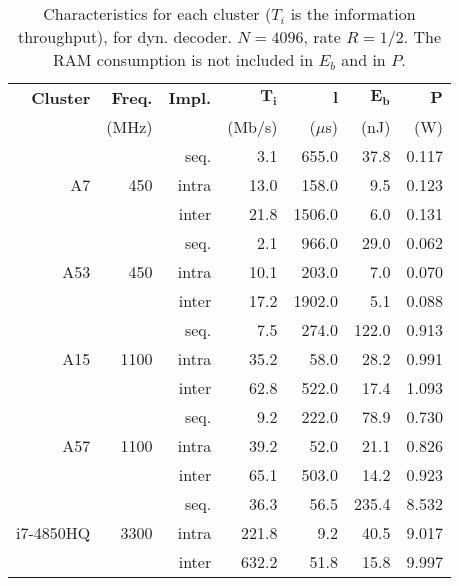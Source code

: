 \begin{table}[htp]
  \caption{Characteristics for each cluster ($T_i$ is the information
    throughput), for dyn. decoder. $N = 4096$, rate $R = 1/2$. The RAM
    consumption is not included in $E_b$ and in $P$.}
  \label{tab:eval_polar_energy_results}
  \begin{center}
  \begin{tabular}{r r r r r r r}
    \textbf{Cluster} & \textbf{Freq.} & \textbf{Impl.} & $\bm{T_i}$ &  $\bm{l}$ & $\boldsymbol{E_b}$ & $\bm{P}$ \\
                     &          (MHz) &                &     (Mb/s) & ($\mu$s)  &               (nJ) &      (W) \\
    \hline
    \hline
    \multirow{3}{*}{A7}        & \multirow{3}{*}{ 450} & seq.  &  3.1 &  655.0 &  37.8 & 0.117 \\
                               &                       & intra & 13.0 &  158.0 &   9.5 & 0.123 \\
                               &                       & inter & 21.8 & 1506.0 &   6.0 & 0.131 \\
    \hline
    \multirow{3}{*}{A53}       & \multirow{3}{*}{ 450} & seq.  &  2.1 &  966.0 &  29.0 & 0.062 \\
                               &                       & intra & 10.1 &  203.0 &   7.0 & 0.070 \\
                               &                       & inter & 17.2 & 1902.0 &   5.1 & 0.088 \\
    \hline
    \multirow{3}{*}{A15}       & \multirow{3}{*}{1100} & seq.  &  7.5 &  274.0 & 122.0 & 0.913 \\
                               &                       & intra & 35.2 &   58.0 &  28.2 & 0.991 \\
                               &                       & inter & 62.8 &  522.0 &  17.4 & 1.093 \\
    \hline
    \multirow{3}{*}{A57}       & \multirow{3}{*}{1100} & seq.  &  9.2 &  222.0 &  78.9 & 0.730 \\
                               &                       & intra & 39.2 &   52.0 &  21.1 & 0.826 \\
                               &                       & inter & 65.1 &  503.0 &  14.2 & 0.923 \\
    \hline
    \multirow{3}{*}{i7-4850HQ} & \multirow{3}{*}{3300} & seq.  &  36.3 &   56.5 & 235.4 & 8.532 \\
                               &                       & intra & 221.8 &    9.2 &  40.5 & 9.017 \\
                               &                       & inter & 632.2 &   51.8 &  15.8 & 9.997 \\
  \end{tabular}
  \end{center}
\end{table}

